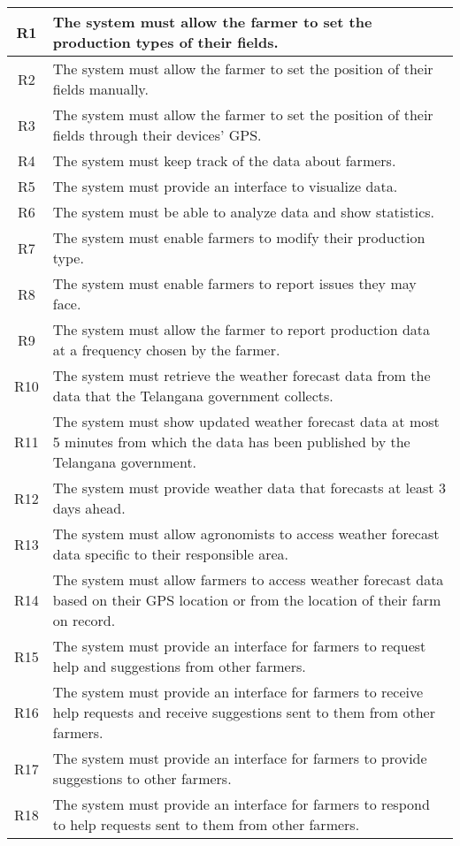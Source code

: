 \begin{center}
\begin{longtable}{|c|>{\raggedright\arraybackslash}m{15cm}|}
 
R1	& The system must allow the farmer to set the production types of their fields.\\\hline
R2	& The system must allow the farmer to set the position of their fields manually.\\\hline
R3	& The system must allow the farmer to set the position of their fields through their devices' GPS.\\\hline
R4	& The system must keep track of the data about farmers.\\\hline
R5	& The system must provide an interface to visualize data.\\\hline
R6	& The system must be able to analyze data and show statistics.\\\hline
R7	& The system must enable farmers to modify their production type.\\\hline
R8	& The system must enable farmers to report issues they may face. \\\hline
R9	& The system must allow the farmer to report production data at a frequency chosen by the farmer. \\\hline
R10	& The system must retrieve the weather forecast data from the data that the Telangana government collects.\\\hline
R11	& The system must show updated weather forecast data at most 5 minutes from which the data has been published by the Telangana government.\\\hline
R12	& The system must provide weather data that forecasts at least 3 days ahead.\\\hline
R13	& The system must allow agronomists to access weather forecast data specific to their responsible area.\\\hline
R14	& The system must allow farmers to access weather forecast data based on their GPS location or from the location of their farm on record.\\\hline
R15	& The system must provide an interface for farmers to request help and suggestions from other farmers.\\\hline
R16	& The system must provide an interface for farmers to receive help requests and receive suggestions sent to them from other farmers.\\\hline
R17	& The system must provide an interface for farmers to provide suggestions to other farmers.\\\hline
R18	& The system must provide an interface for farmers to respond to help requests sent to them from other farmers.\\\hline

\end{longtable}
\end{center}
